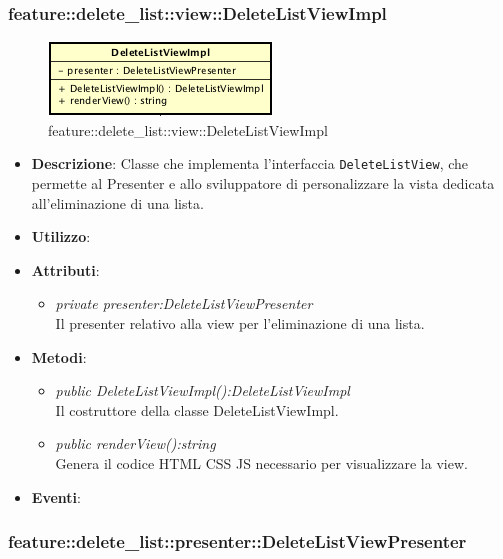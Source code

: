 \subsubsection{feature::delete\_list::view::DeleteListViewImpl}

\label{feature::delete_list::view::DeleteListViewImpl}
\begin{figure}[ht]
	\centering
	\includegraphics[scale=0.5]{Sezioni/SottosezioniST/img/app/DeleteListViewImpl.png}
	\caption{feature::delete\_list::view::DeleteListViewImpl}
\end{figure}

\begin{itemize}
\item \textbf{Descrizione}: Classe che implementa l'interfaccia \texttt{DeleteListView}, che permette al Presenter e allo sviluppatore di personalizzare la vista dedicata all'eliminazione di una lista.
\item \textbf{Utilizzo}:
\item \textbf{Attributi}: 
	\begin{itemize}
	\item \textit{private presenter:DeleteListViewPresenter}\\
		Il presenter relativo alla view per l'eliminazione di una lista.
	\end{itemize}
\item \textbf{Metodi}:
	\begin{itemize}
	\item \textit{public DeleteListViewImpl():DeleteListViewImpl}\\
	Il costruttore della classe DeleteListViewImpl.
	\item \textit{public renderView():string}\\
			Genera il codice HTML CSS JS necessario per visualizzare la view.
	\end{itemize}
\item \textbf{Eventi}:
\end{itemize}

\subsubsection{feature::delete\_list::presenter::DeleteListViewPresenter}

